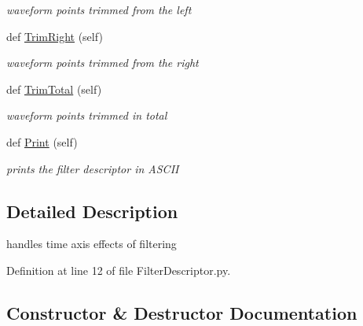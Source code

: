 \begin{DoxyCompactItemize}
\begin{DoxyCompactList}\small\item\em waveform points trimmed from the left \end{DoxyCompactList}\item 
def \hyperlink{classSignalIntegrity_1_1TimeDomain_1_1Filters_1_1FilterDescriptor_1_1FilterDescriptor_a284517d97da4a4e39890e41cbfa2a007}{Trim\+Right} (self)
\begin{DoxyCompactList}\small\item\em waveform points trimmed from the right \end{DoxyCompactList}\item 
def \hyperlink{classSignalIntegrity_1_1TimeDomain_1_1Filters_1_1FilterDescriptor_1_1FilterDescriptor_a8b3334081fe073524a4e0c068a61a3c6}{Trim\+Total} (self)
\begin{DoxyCompactList}\small\item\em waveform points trimmed in total \end{DoxyCompactList}\item 
\mbox{\label{classSignalIntegrity_1_1TimeDomain_1_1Filters_1_1FilterDescriptor_1_1FilterDescriptor_a0203fc9c617eec80ba28741251ee3b86}} 
def \hyperlink{classSignalIntegrity_1_1TimeDomain_1_1Filters_1_1FilterDescriptor_1_1FilterDescriptor_a0203fc9c617eec80ba28741251ee3b86}{Print} (self)
\begin{DoxyCompactList}\small\item\em prints the filter descriptor in A\+S\+C\+II \end{DoxyCompactList}\end{DoxyCompactItemize}


\subsection{Detailed Description}
handles time axis effects of filtering 

Definition at line 12 of file Filter\+Descriptor.\+py.



\subsection{Constructor \& Destructor Documentation}
\mbox{\label{classSignalIntegrity_1_1TimeDomain_1_1Filters_1_1FilterDescriptor_1_1FilterDescriptor_a5661d52c9fb7ff469d450299f14df811}} 
